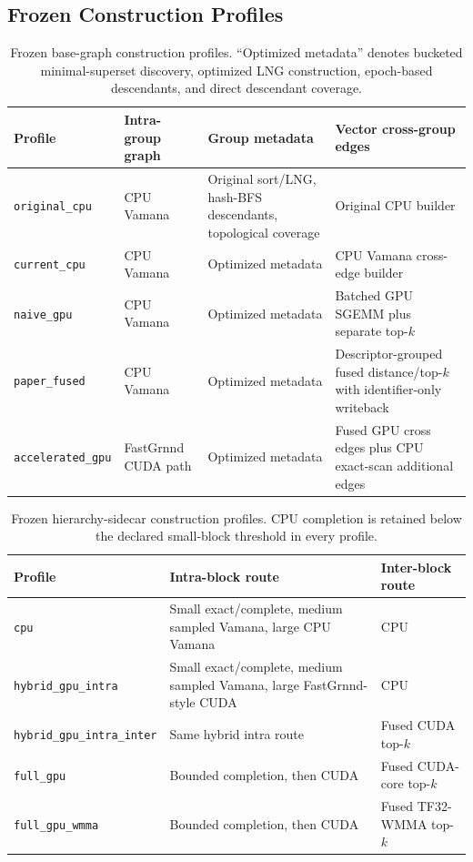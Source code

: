 \subsection{Frozen Construction Profiles}
\begin{table}[t]
\caption{Frozen base-graph construction profiles.  ``Optimized metadata''
denotes bucketed minimal-superset discovery, optimized LNG construction,
epoch-based descendants, and direct descendant coverage.}
\label{tab:base-build-profiles}
\centering
\scriptsize
\begin{tabular}{p{}p{}p{}p{}}
\toprule
Profile & Intra-group graph & Group metadata & Vector cross-group edges \\
\midrule
\texttt{original\_cpu} & CPU Vamana & Original sort/LNG, hash-BFS descendants, topological coverage & Original CPU builder \\
\texttt{current\_cpu} & CPU Vamana & Optimized metadata & CPU Vamana cross-edge builder \\
\texttt{naive\_gpu} & CPU Vamana & Optimized metadata & Batched GPU SGEMM plus separate top-$k$ \\
\texttt{paper\_fused} & CPU Vamana & Optimized metadata & Descriptor-grouped fused distance/top-$k$ with identifier-only writeback \\
\texttt{accelerated\_gpu} & FastGrnnd CUDA path & Optimized metadata & Fused GPU cross edges plus CPU exact-scan additional edges \\
\bottomrule
\end{tabular}
\end{table}

\begin{table}[t]
\caption{Frozen hierarchy-sidecar construction profiles.  CPU completion is
retained below the declared small-block threshold in every profile.}
\label{tab:hierarchy-build-profiles}
\centering
\scriptsize
\begin{tabular}{p{}p{}p{}}
\toprule
Profile & Intra-block route & Inter-block route \\
\midrule
\texttt{cpu} & Small exact/complete, medium sampled Vamana, large CPU Vamana & CPU \\
\texttt{hybrid\_gpu\_intra} & Small exact/complete, medium sampled Vamana, large FastGrnnd-style CUDA & CPU \\
\texttt{hybrid\_gpu\_intra\_inter} & Same hybrid intra route & Fused CUDA top-$k$ \\
\texttt{full\_gpu} & Bounded completion, then CUDA & Fused CUDA-core top-$k$ \\
\texttt{full\_gpu\_wmma} & Bounded completion, then CUDA & Fused TF32-WMMA top-$k$ \\
\bottomrule
\end{tabular}
\end{table}
